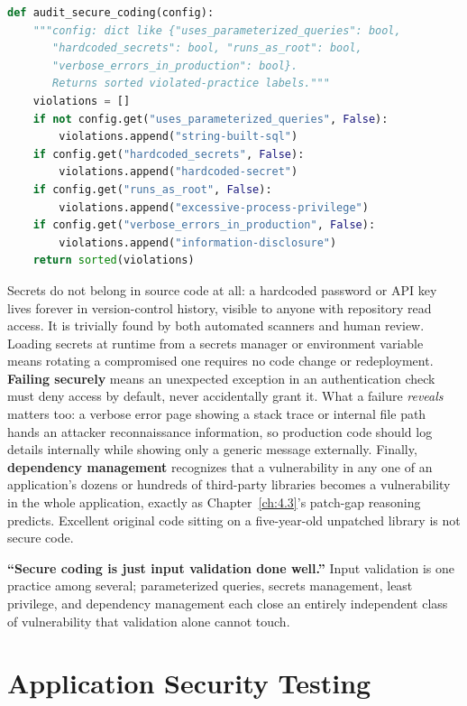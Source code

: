 \begin{lstlisting}[language=Python, caption={Auditing an application configuration against secure-coding practices}]
def audit_secure_coding(config):
    """config: dict like {"uses_parameterized_queries": bool,
       "hardcoded_secrets": bool, "runs_as_root": bool,
       "verbose_errors_in_production": bool}.
       Returns sorted violated-practice labels."""
    violations = []
    if not config.get("uses_parameterized_queries", False):
        violations.append("string-built-sql")
    if config.get("hardcoded_secrets", False):
        violations.append("hardcoded-secret")
    if config.get("runs_as_root", False):
        violations.append("excessive-process-privilege")
    if config.get("verbose_errors_in_production", False):
        violations.append("information-disclosure")
    return sorted(violations)
\end{lstlisting}

Secrets do not belong in source code at all: a hardcoded password or API key lives forever in
version-control history, visible to anyone with repository read access. It is trivially found by
both automated scanners and human review. Loading secrets at runtime from a secrets manager or
environment variable means rotating a compromised one requires no code change or redeployment.
\textbf{Failing securely} means an unexpected exception in an authentication check must deny access
by default, never accidentally grant it. What a failure \emph{reveals} matters too: a verbose error
page showing a stack trace or internal file path hands an attacker reconnaissance information, so
production code should log details internally while showing only a generic message externally.
Finally, \textbf{dependency management} recognizes that a vulnerability in any one of an
application's dozens or hundreds of third-party libraries becomes a vulnerability in the whole
application, exactly as Chapter~\ref{ch:4.3}'s patch-gap reasoning predicts. Excellent original code
sitting on a five-year-old unpatched library is not secure code.

\begin{misconception}
\textbf{``Secure coding is just input validation done well.''} Input validation is one practice
among several; parameterized queries, secrets management, least privilege, and dependency management
each close an entirely independent class of vulnerability that validation alone cannot touch.
\end{misconception}

\section{Application Security Testing}

